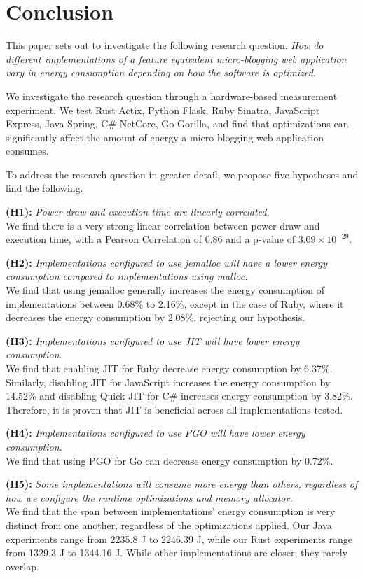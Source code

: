 \documentclass[main.tex]{subfiles}
\begin{document}
\section{Conclusion}

This paper sets out to investigate the following research question. \emph{How do different implementations of a feature equivalent micro-blogging web application vary in energy consumption depending on how the software is optimized.}

We investigate the research question through a hardware-based measurement experiment. We test Rust Actix, Python Flask, Ruby Sinatra, JavaScript Express, Java Spring, C\# NetCore, Go Gorilla, and find that optimizations can significantly affect the amount of energy a micro-blogging web application consumes.

To address the research question in greater detail, we propose five hypotheses and find the following.

\textbf{(H1):} \emph{Power draw and execution time are linearly correlated.}
\\
We find there is a very strong linear correlation between power draw and execution time, with a Pearson Correlation of 0.86 and a p-value of $3.09 \times 10^{-29}$.

\textbf{(H2):} \emph{Implementations configured to use jemalloc will have a lower energy consumption compared to implementations using malloc.}
\\
We find that using jemalloc generally increases the energy consumption of implementations between 0.68\% to 2.16\%, except in the case of Ruby, where it decreases the energy consumption by 2.08\%, rejecting our hypothesis.

\textbf{(H3):} \emph{Implementations configured to use JIT will have lower energy consumption.}
\\
We find that enabling JIT for Ruby decrease energy consumption by 6.37\%. Similarly, disabling JIT for JavaScript increases the energy consumption by 14.52\% and disabling Quick-JIT for C\# increases energy consumption by 3.82\%. Therefore, it is proven that JIT is beneficial across all implementations tested. 

\textbf{(H4):} \emph{Implementations configured to use PGO will have lower energy consumption.}
\\
We find that using PGO for Go can decrease energy consumption by 0.72\%.

\textbf{(H5):} \emph{Some implementations will consume more energy than others, regardless of how we configure the runtime optimizations and memory allocator.}
\\
We find that the span between implementations' energy consumption is very distinct from one another, regardless of the optimizations applied. Our Java experiments range from 2235.8 J to 2246.39 J, while our Rust experiments range from 1329.3 J to 1344.16 J. While other implementations are closer, they rarely overlap.
\end{document}
